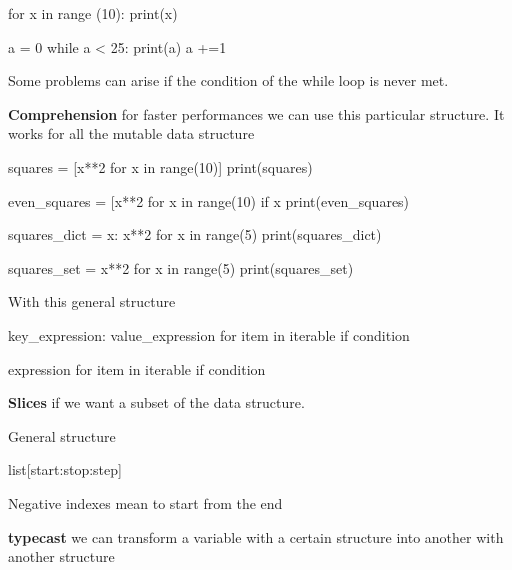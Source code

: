 \begin{pythoncode}
    for x in range (10):
        print(x)

    a = 0
    while a < 25:
        print(a)
        a +=1
\end{pythoncode}

Some problems can arise if the condition of the while loop is never met.

\newpage



\textbf{Comprehension} \ra for faster performances we can use this particular structure. It works for all the mutable data structure

\begin{pythoncode}
    squares = [x**2 for x in range(10)]
    print(squares)

    even_squares = [x**2 for x in range(10) if x %
    print(even_squares)


    squares_dict = {x: x**2 for x in range(5)}
    print(squares_dict)

    squares_set = {x**2 for x in range(5)}
    print(squares_set)
\end{pythoncode}

With this general structure

\begin{pythoncode}
    {key_expression: value_expression for item in iterable if condition}

    {expression for item in iterable if condition}

\end{pythoncode}

\textbf{Slices} \ra if we want a subset of the data structure.

\vspace{10pt}

General structure

\begin{pythoncode}
    list[start:stop:step]
\end{pythoncode}

Negative indexes mean to start from the end

\vspace{10pt}

\textbf{typecast} \ra we can transform a variable with a certain structure into another with another structure

